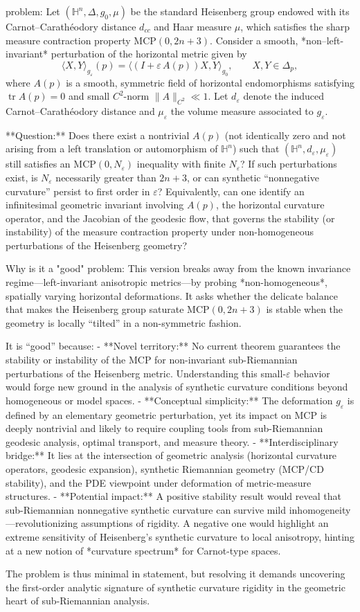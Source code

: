 problem:  
Let \((\mathbb{H}^n,\Delta,g_0,\mu)\) be the standard Heisenberg group endowed with its Carnot–Carathéodory distance \(d_{cc}\) and Haar measure \(\mu\), which satisfies the sharp measure contraction property \(\mathrm{MCP}(0,2n+3)\).  
Consider a smooth, *non–left-invariant* perturbation of the horizontal metric given by  
\[
\langle X,Y\rangle_{g_\varepsilon}(p) = \langle (I+\varepsilon\,A(p))X,Y\rangle_{g_0}, \qquad X,Y\in\Delta_p,
\]
where \(A(p)\) is a smooth, symmetric field of horizontal endomorphisms satisfying \(\operatorname{tr}A(p)=0\) and small \(C^2\)-norm \(\|A\|_{C^2}\ll1\). Let \(d_\varepsilon\) denote the induced Carnot–Carathéodory distance and \(\mu_\varepsilon\) the volume measure associated to \(g_\varepsilon\).  

**Question:**  
Does there exist a nontrivial \(A(p)\) (not identically zero and not arising from a left translation or automorphism of \(\mathbb{H}^n\)) such that \((\mathbb{H}^n,d_\varepsilon,\mu_\varepsilon)\) still satisfies an \(\mathrm{MCP}(0,N_\varepsilon)\) inequality with finite \(N_\varepsilon\)?  
If such perturbations exist, is \(N_\varepsilon\) necessarily greater than \(2n+3\), or can synthetic “nonnegative curvature” persist to first order in \(\varepsilon\)?  
Equivalently, can one identify an infinitesimal geometric invariant involving \(A(p)\), the horizontal curvature operator, and the Jacobian of the geodesic flow, that governs the stability (or instability) of the measure contraction property under non-homogeneous perturbations of the Heisenberg geometry?  

Why is it a "good" problem:  
This version breaks away from the known invariance regime—left-invariant anisotropic metrics—by probing *non-homogeneous*, spatially varying horizontal deformations. It asks whether the delicate balance that makes the Heisenberg group saturate \(\mathrm{MCP}(0,2n+3)\) is stable when the geometry is locally “tilted” in a non-symmetric fashion.  

It is “good” because:  
- **Novel territory:** No current theorem guarantees the stability or instability of the MCP for non-invariant sub-Riemannian perturbations of the Heisenberg metric. Understanding this small-\(\varepsilon\) behavior would forge new ground in the analysis of synthetic curvature conditions beyond homogeneous or model spaces.  
- **Conceptual simplicity:** The deformation \(g_\varepsilon\) is defined by an elementary geometric perturbation, yet its impact on MCP is deeply nontrivial and likely to require coupling tools from sub-Riemannian geodesic analysis, optimal transport, and measure theory.  
- **Interdisciplinary bridge:** It lies at the intersection of geometric analysis (horizontal curvature operators, geodesic expansion), synthetic Riemannian geometry (MCP/CD stability), and the PDE viewpoint under deformation of metric-measure structures.  
- **Potential impact:** A positive stability result would reveal that sub-Riemannian nonnegative synthetic curvature can survive mild inhomogeneity—revolutionizing assumptions of rigidity. A negative one would highlight an extreme sensitivity of Heisenberg’s synthetic curvature to local anisotropy, hinting at a new notion of *curvature spectrum* for Carnot-type spaces.  

The problem is thus minimal in statement, but resolving it demands uncovering the first-order analytic signature of synthetic curvature rigidity in the geometric heart of sub-Riemannian analysis.